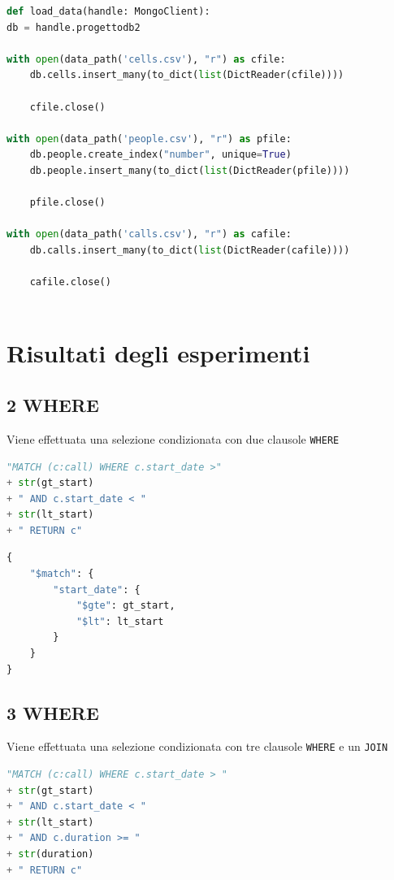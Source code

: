     \begin{lstlisting}[language=Python, caption=load\_data()]
def load_data(handle: MongoClient):
db = handle.progettodb2

with open(data_path('cells.csv'), "r") as cfile:
    db.cells.insert_many(to_dict(list(DictReader(cfile))))

    cfile.close()

with open(data_path('people.csv'), "r") as pfile:
    db.people.create_index("number", unique=True)
    db.people.insert_many(to_dict(list(DictReader(pfile))))

    pfile.close()

with open(data_path('calls.csv'), "r") as cafile:
    db.calls.insert_many(to_dict(list(DictReader(cafile))))

    cafile.close()
        
    \end{lstlisting}


\pagebreak
\section{Risultati degli esperimenti}
    \subsection{2 WHERE}
    Viene effettuata una selezione condizionata con due clausole \texttt{WHERE}

    \begin{lstlisting}[language=Python, caption=Neo4j]
"MATCH (c:call) WHERE c.start_date >" 
+ str(gt_start) 
+ " AND c.start_date < " 
+ str(lt_start) 
+ " RETURN c"
    \end{lstlisting}

    \begin{lstlisting}[language=Python, caption=MongoDB]
{
    "$match": {
        "start_date": {
            "$gte": gt_start,
            "$lt": lt_start
        }
    }
}
    \end{lstlisting}


    \subsection{3 WHERE}
    Viene effettuata una selezione condizionata con tre clausole \texttt{WHERE}
    e un \texttt{JOIN}

    \begin{lstlisting}[language=Python, caption=Neo4j]
"MATCH (c:call) WHERE c.start_date > " 
+ str(gt_start) 
+ " AND c.start_date < " 
+ str(lt_start) 
+ " AND c.duration >= " 
+ str(duration) 
+ " RETURN c"

    \end{lstlisting}


